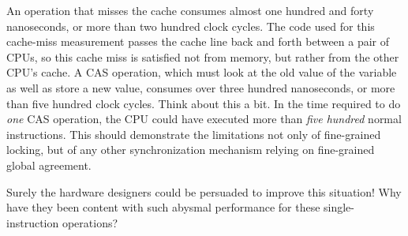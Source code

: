 An operation that misses the cache consumes almost one hundred and forty
nanoseconds, or more than two hundred clock cycles.
The code used for this cache-miss measurement passes the cache line
back and forth between a pair of CPUs, so this cache miss is satisfied
not from memory, but rather from the other CPU's cache.
A CAS operation, which must look at the old value of the variable as
well as store a new value, consumes over three hundred nanoseconds, or
more than five hundred clock cycles.
Think about this a bit.
In the time required to do \emph{one} CAS operation, the CPU could have
executed more than \emph{five hundred} normal instructions.
This should demonstrate the limitations not only of fine-grained locking,
but of any other synchronization mechanism relying on fine-grained
global agreement.

\QuickQuiz{}
	Surely the hardware designers could be persuaded to improve
	this situation!
	Why have they been content with such abysmal performance
	for these single-instruction operations?
